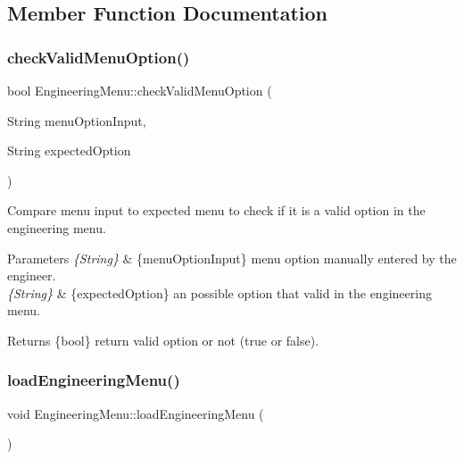 \subsection{Member Function Documentation}
\mbox{\label{class_engineering_menu_a607200a4b3f43c227f35df325b79e12c}} 
\subsubsection{\texorpdfstring{check\+Valid\+Menu\+Option()}{checkValidMenuOption()}}
{\footnotesize\ttfamily bool Engineering\+Menu\+::check\+Valid\+Menu\+Option (\begin{DoxyParamCaption}\item[{String}]{menu\+Option\+Input,  }\item[{String}]{expected\+Option }\end{DoxyParamCaption})}

Compare menu input to expected menu to check if it is a valid option in the engineering menu. 
\begin{DoxyParams}{Parameters}
{\em \{\+String\}} & \{menu\+Option\+Input\} menu option manually entered by the engineer. \\
\hline
{\em \{\+String\}} & \{expected\+Option\} an possible option that valid in the engineering menu. \\
\hline
\end{DoxyParams}
\begin{DoxyReturn}{Returns}
\{bool\} return valid option or not (true or false). 
\end{DoxyReturn}
\mbox{\label{class_engineering_menu_a1fdb55127655851a918ba357206f0b1f}} 
\subsubsection{\texorpdfstring{load\+Engineering\+Menu()}{loadEngineeringMenu()}}
{\footnotesize\ttfamily void Engineering\+Menu\+::load\+Engineering\+Menu (\begin{DoxyParamCaption}{ }\end{DoxyParamCaption})}

